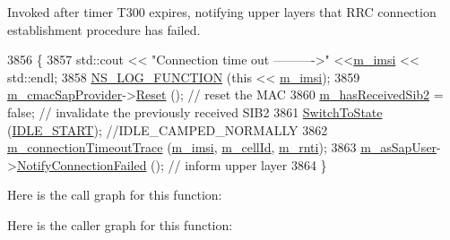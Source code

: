 Invoked after timer T300 expires, notifying upper layers that R\+RC connection establishment procedure has failed. 


\begin{DoxyCode}
3856 \{
3857   std::cout << \textcolor{stringliteral}{"Connection time out  ---------->"} <<\hyperlink{classns3_1_1LteUeRrc_a1d825677309d17bdf729920f7dafd011}{m\_imsi} << std::endl;
3858         \hyperlink{log-macros-disabled_8h_a90b90d5bad1f39cb1b64923ea94c0761}{NS\_LOG\_FUNCTION} (\textcolor{keyword}{this} << \hyperlink{classns3_1_1LteUeRrc_a1d825677309d17bdf729920f7dafd011}{m\_imsi});
3859   \hyperlink{classns3_1_1LteUeRrc_a5a7bffd2040d73eb5db1aaef849d0396}{m\_cmacSapProvider}->\hyperlink{classns3_1_1LteUeCmacSapProvider_ae020f759b912c9347cd0845defb247de}{Reset} ();       \textcolor{comment}{// reset the MAC}
3860   \hyperlink{classns3_1_1LteUeRrc_a477d88924683dd32041cd06877694e8b}{m\_hasReceivedSib2} = \textcolor{keyword}{false};         \textcolor{comment}{// invalidate the previously received SIB2}
3861   \hyperlink{classns3_1_1LteUeRrc_a15f1bea4c3c8d3f9949b234c0cfa12e6}{SwitchToState} (\hyperlink{classns3_1_1LteUeRrc_a241012c291e75681150c9214e11f6145ae7b27c84aeb7d7d86f74bafa885b9281}{IDLE\_START});  \textcolor{comment}{//IDLE\_CAMPED\_NORMALLY}
3862   \hyperlink{classns3_1_1LteUeRrc_a41fda1be11c17492bd41f57c33941c83}{m\_connectionTimeoutTrace} (\hyperlink{classns3_1_1LteUeRrc_a1d825677309d17bdf729920f7dafd011}{m\_imsi}, \hyperlink{classns3_1_1LteUeRrc_aa9d3317734eea9158371d9fccf3a0c48}{m\_cellId}, 
      \hyperlink{classns3_1_1LteUeRrc_a8e078d8ef0ad23e670fe2ef08caab84f}{m\_rnti});
3863   \hyperlink{classns3_1_1LteUeRrc_aef8b3b6b1b1527ce6946472d1c1888dc}{m\_asSapUser}->\hyperlink{classns3_1_1LteAsSapUser_a54158d846375fb6ddce21e51a765bed6}{NotifyConnectionFailed} ();  \textcolor{comment}{// inform upper layer}
3864 \}
\end{DoxyCode}


Here is the call graph for this function\+:




Here is the caller graph for this function\+:


